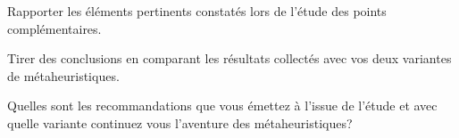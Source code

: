 \noindent
Rapporter les éléments pertinents constatés lors de l'étude des points complémentaires.

%
%

\vspace{5mm}
\noindent
{}
\vspace{2mm}

\noindent
Tirer des conclusions en comparant les résultats collectés avec vos deux variantes de métaheuristiques.

\noindent
Quelles sont les recommandations que vous émettez à l'issue de l'étude et avec quelle variante continuez vous l'aventure des métaheuristiques?


